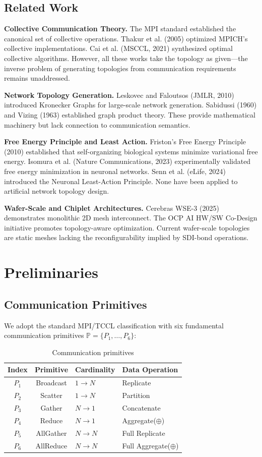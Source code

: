 \documentclass[12pt]{article}
\begin{document}
\subsection{Related Work}

\textbf{Collective Communication Theory.} The MPI standard
established the canonical set of collective operations. Thakur et
al. (2005) optimized MPICH's collective implementations. Cai et al.
(MSCCL, 2021) synthesized optimal collective algorithms. However,
all these works take the topology as given---the inverse problem of
generating topologies from communication requirements remains
unaddressed.

\textbf{Network Topology Generation.} Leskovec and Faloutsos (JMLR,
2010) introduced Kronecker Graphs for large-scale network generation.
Sabidussi (1960) and Vizing (1963) established graph product theory.
These provide mathematical machinery but lack connection to
communication semantics.

\textbf{Free Energy Principle and Least Action.} Friston's Free
Energy Principle (2010) established that self-organizing biological
systems minimize variational free energy. Isomura et al. (Nature
Communications, 2023) experimentally validated free energy
minimization in neuronal networks. Senn et al. (eLife, 2024)
introduced the Neuronal Least-Action Principle. None have been
applied to artificial network topology design.

\textbf{Wafer-Scale and Chiplet Architectures.} Cerebras WSE-3 (2025)
demonstrates monolithic 2D mesh interconnect. The OCP AI HW/SW
Co-Design initiative promotes topology-aware optimization. Current
wafer-scale topologies are static meshes lacking the
reconfigurability implied by SDI-bond operations.

\section{Preliminaries}
\subsection{Communication Primitives}

We adopt the standard MPI/TCCL classification with six fundamental
communication primitives $\mathbb{P} = \{P_1, \ldots, P_6\}$:

\begin{table}[h]
\centering
\begin{tabular}{ccll}
\toprule
Index & Primitive & Cardinality & Data Operation \\
\midrule
$P_1$ & Broadcast   & $1 \to N$ & Replicate \\
$P_2$ & Scatter     & $1 \to N$ & Partition \\
$P_3$ & Gather      & $N \to 1$ & Concatenate \\
$P_4$ & Reduce      & $N \to 1$ & Aggregate($\oplus$) \\
$P_5$ & AllGather   & $N \to N$ & Full Replicate \\
$P_6$ & AllReduce   & $N \to N$ & Full Aggregate($\oplus$) \\
\bottomrule
\end{tabular}
\caption{Communication primitives}
\end{table}
\end{document}
